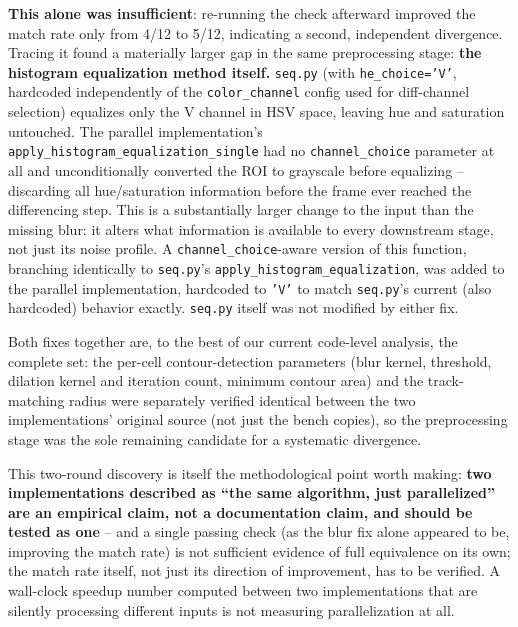 \documentclass[conference]{IEEEtran}
\newcommand{\code}[1]{\texttt{#1}}
\begin{document}
\textbf{This alone was insufficient}: re-running the check afterward
improved the match rate only from 4/12 to 5/12, indicating a second,
independent divergence. Tracing it found a materially larger gap in the
same preprocessing stage: \textbf{the histogram equalization method
itself.} \code{seq.py} (with \code{he\_choice='V'}, hardcoded
independently of the \code{color\_channel} config used for diff-channel
selection) equalizes only the V channel in HSV space, leaving hue and
saturation untouched. The parallel implementation's
\code{apply\_histogram\_equalization\_single} had no
\code{channel\_choice} parameter at all and unconditionally converted
the ROI to grayscale before equalizing -- discarding all hue/saturation
information before the frame ever reached the differencing step. This
is a substantially larger change to the input than the missing blur:
it alters what information is available to every downstream stage, not
just its noise profile. A \code{channel\_choice}-aware version of this
function, branching identically to \code{seq.py}'s
\code{apply\_histogram\_equalization}, was added to the parallel
implementation, hardcoded to \code{'V'} to match \code{seq.py}'s current
(also hardcoded) behavior exactly. \code{seq.py} itself was not modified
by either fix.

Both fixes together are, to the best of our current code-level analysis,
the complete set: the per-cell contour-detection parameters (blur
kernel, threshold, dilation kernel and iteration count, minimum contour
area) and the track-matching radius were separately verified identical
between the two implementations' original source (not just the bench
copies), so the preprocessing stage was the sole remaining candidate for
a systematic divergence.

This two-round discovery is itself the methodological point worth
making: \textbf{two implementations described as ``the same algorithm,
just parallelized'' are an empirical claim, not a documentation claim,
and should be tested as one} -- and a single passing check (as the blur
fix alone appeared to be, improving the match rate) is not sufficient
evidence of full equivalence on its own; the match rate itself, not just
its direction of improvement, has to be verified. A wall-clock speedup
number computed between two implementations that are silently
processing different inputs is not measuring parallelization at all.
\end{document}
